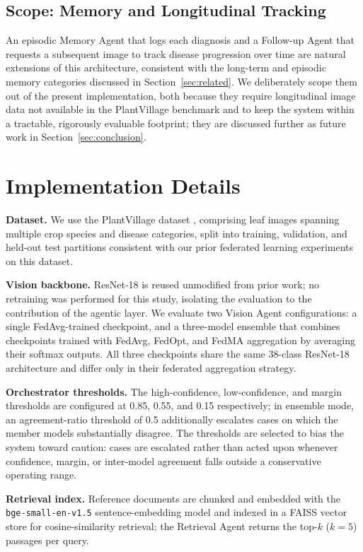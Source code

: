 \documentclass[conference]{IEEEtran}
\begin{document}
\subsection{Scope: Memory and Longitudinal Tracking}
An episodic Memory Agent that logs each diagnosis and a Follow-up Agent that requests a subsequent image to track disease progression over time are natural extensions of this architecture, consistent with the long-term and episodic memory categories discussed in Section~\ref{sec:related}. We deliberately scope them out of the present implementation, both because they require longitudinal image data not available in the PlantVillage benchmark and to keep the system within a tractable, rigorously evaluable footprint; they are discussed further as future work in Section~\ref{sec:conclusion}.

\section{Implementation Details}
\label{sec:impl}

\textbf{Dataset.} We use the PlantVillage dataset \cite{r_hughes2015}, comprising leaf images spanning multiple crop species and disease categories, split into training, validation, and held-out test partitions consistent with our prior federated learning experiments on this dataset.

\textbf{Vision backbone.} ResNet-18 \cite{r_he2016} is reused unmodified from prior work; no retraining was performed for this study, isolating the evaluation to the contribution of the agentic layer. We evaluate two Vision Agent configurations: a single FedAvg-trained checkpoint, and a three-model ensemble that combines checkpoints trained with FedAvg, FedOpt, and FedMA aggregation by averaging their softmax outputs. All three checkpoints share the same 38-class ResNet-18 architecture and differ only in their federated aggregation strategy.

\textbf{Orchestrator thresholds.} The high-confidence, low-confidence, and margin thresholds are configured at 0.85, 0.55, and 0.15 respectively; in ensemble mode, an agreement-ratio threshold of 0.5 additionally escalates cases on which the member models substantially disagree. The thresholds are selected to bias the system toward caution: cases are escalated rather than acted upon whenever confidence, margin, or inter-model agreement falls outside a conservative operating range.

\textbf{Retrieval index.} Reference documents are chunked and embedded with the \texttt{bge-small-en-v1.5} sentence-embedding model and indexed in a FAISS vector store for cosine-similarity retrieval; the Retrieval Agent returns the top-$k$ ($k=5$) passages per query.
\end{document}
